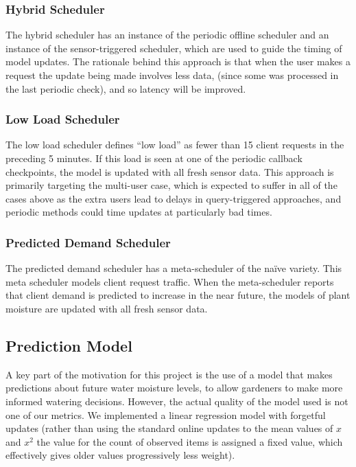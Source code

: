 \documentclass[a4paper]{acm_proc_article-sp}
\makeatletter
\newcommand{\naive}{na\"{i}ve\@\xspace}
\makeatother
\begin{document}
\subsubsection{Hybrid Scheduler}

The hybrid scheduler has an instance of the periodic offline scheduler and an instance of the sensor-triggered scheduler, which are used to guide the timing of model updates.  The rationale behind this approach is that when the user makes a request the update being made involves less data, (since some was processed in the last periodic check), and so latency will be improved.

\subsubsection{Low Load Scheduler}

The low load scheduler defines ``low load'' as fewer than 15 client requests in the preceding 5 minutes.  If this load is seen at one of the periodic callback checkpoints, the model is updated with all fresh sensor data.  This approach is primarily targeting the multi-user case, which is expected to suffer in all of the cases above as the extra users lead to delays in query-triggered approaches, and periodic methods could time updates at particularly bad times.

\subsubsection{Predicted Demand Scheduler}

The predicted demand scheduler has a meta-scheduler of the \naive variety.  This meta scheduler models client request traffic.  When the meta-scheduler reports that client demand is predicted to increase in the near future, the models of plant moisture are updated with all fresh sensor data.

\subsection{Prediction Model}

A key part of the motivation for this project is the use of a model that makes predictions about future water moisture levels, to allow gardeners to make more informed watering decisions.  However, the actual quality of the model used is not one of our metrics.  We implemented a linear regression model with forgetful updates (rather than using the standard online updates to the mean values of $x$ and $x^2$ the value for the count of observed items is assigned a fixed value, which effectively gives older values progressively less weight).
\end{document}
